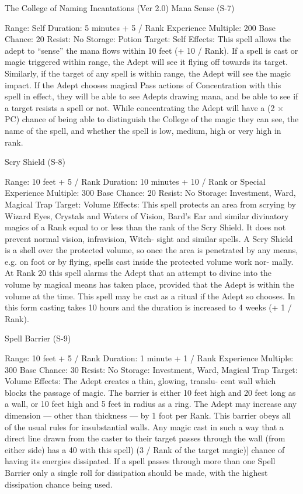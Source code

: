 \begin{Chapter}{The College of Naming Incantations (Ver 2.0)}
Mana Sense (S-7) 

Range: Self 
Duration: 5 minutes + 5 / Rank 
Experience Multiple: 200 
Base Chance: 20%
Resist: No 
Storage: Potion 
Target: Self 
Effects:  This  spell  allows  the  adept  to  “sense”  the 
mana flows within 10 feet (+ 10 / Rank). If a spell 
is  cast  or  magic  triggered  within  range,  the  Adept 
will see it flying off towards its target. Similarly, if 
the  target  of  any  spell  is  within  range,  the  Adept 
will  see  the  magic  impact.  If  the  Adept  chooses 
magical  Pass  actions  of  Concentration  with  this 
spell  in  effect,  they  will  be  able  to  see  Adepts 
drawing mana, and be able to see if a target resists 
a  spell  or  not.  While  concentrating  the  Adept  will 
have a (2 × PC) chance of being able to distinguish 
the College of the magic they can see, the name of 
the  spell,  and  whether  the  spell  is  low,  medium, 
high or very high in rank. 

Scry Shield (S-8) 

Range: 10 feet + 5 / Rank 
Duration: 10 minutes + 10 / Rank or Special 
Experience Multiple: 300 
Base Chance: 20%
Resist: No 
Storage: Investment, Ward, Magical Trap 
Target: Volume 
Effects: This spell protects an area from scrying by 
Wizard  Eyes,  Crystals  and  Waters  of  Vision, 
Bard’s Ear and similar divinatory magics of a Rank 
equal to or less than the rank of the Scry Shield. It 
does not prevent normal vision, infravision, Witch-
sight  and  similar  spells.  A  Scry  Shield  is  a  shell 
over  the  protected  volume,  so  once  the  area  is 
penetrated by any means, e.g. on foot or by flying, 
spells  cast  inside  the  protected  volume  work  nor-
mally. At Rank 20 this spell alarms the Adept that 
an  attempt  to  divine  into  the  volume  by  magical 
means  has  taken  place,  provided  that  the  Adept  is 
within  the  volume  at  the  time.  This  spell  may  be 
cast as a ritual if the Adept so chooses. In this form 
casting takes 10 hours and the duration is increased 
to 4 weeks (+ 1 / Rank). 

Spell Barrier (S-9) 

Range: 10 feet + 5 / Rank 
Duration: 1 minute + 1 / Rank 
Experience Multiple: 300 
Base Chance: 30%
Resist: No 
Storage: Investment, Ward, Magical Trap 
Target: Volume 
Effects: The Adept creates a thin, glowing, translu-
cent  wall  which blocks  the  passage  of  magic.  The 
barrier  is  either  10  feet  high and 20 feet  long  as  a 
wall, or 10 feet high and 5 feet in radius as a ring. 
The  Adept  may  increase  any  dimension  —  other 
than thickness — by 1 foot per Rank. This barrier 
obeys all  of the usual rules for insubstantial walls. 
Any  magic  cast  in  such  a  way  that  a  direct  line 
drawn from the caster to their target passes through 
the wall (from either side) has a 40%
with  this  spell)  (3  /  Rank  of  the  target  magic)] 
chance  of  having  its  energies  dissipated.  If  a  spell 
passes through more than one Spell  Barrier only a 
single roll for dissipation should be made, with the 
highest dissipation chance being used. 


\end{Chapter}
